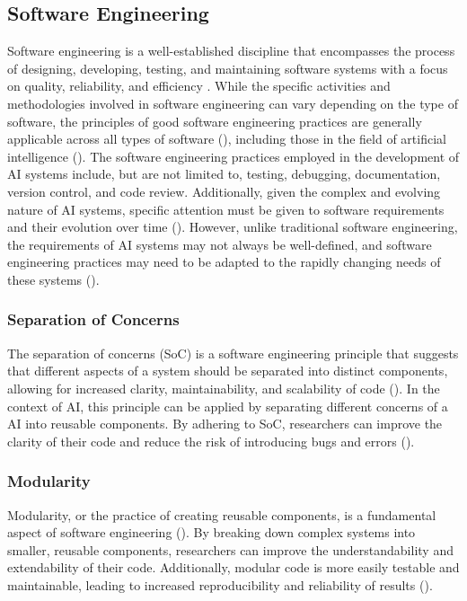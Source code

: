 \subsection{Software Engineering}
Software engineering is a well-established discipline that encompasses the process of designing, developing, testing, and maintaining software systems with a focus on quality, reliability, and efficiency \cite{pressman2010software}. While the specific activities and methodologies involved in software engineering can vary depending on the type of software, the principles of good software engineering practices are generally applicable across all types of software (\cite{pressman2010software}), including those in the field of artificial intelligence (\cite{se4dl,wan2019does,martinez2022softwareAI,davis2011understandingmodularity}). The software engineering practices employed in the development of AI systems include, but are not limited to, testing, debugging, documentation, version control, and code review. Additionally, given the complex and evolving nature of AI systems, specific attention must be given to software requirements and their evolution over time (\cite{heyn2021requirement,belani2019requirements}). However, unlike traditional software engineering, the requirements of AI systems may not always be well-defined, and software engineering practices may need to be adapted to the rapidly changing needs of these systems (\cite{heyn2021requirement,belani2019requirements}). 


\subsubsection{Separation of Concerns}
 The separation of concerns (SoC) is a software engineering principle that suggests that different aspects of a system should be separated into distinct components, allowing for increased clarity, maintainability, and scalability of code (\cite{pressman2010software, de2002importance}). 
 In the context of AI, this principle can be applied by separating different concerns of a AI into reusable components. By adhering to SoC, researchers can improve the clarity of their code and reduce the risk of introducing bugs and errors (\cite{mo2016decoupling,mo2016decoupling,pressman2010software, de2002importance}).

\subsubsection{Modularity}
Modularity, or the practice of creating reusable components, is a fundamental aspect of software engineering (\cite{pressman2010software}). By breaking down complex systems into smaller, reusable components, researchers can improve the understandability and extendability of their code. Additionally, modular code is more easily testable and maintainable, leading to increased reproducibility and reliability of results (\cite{amershi2019software,pressman2010software}). 
